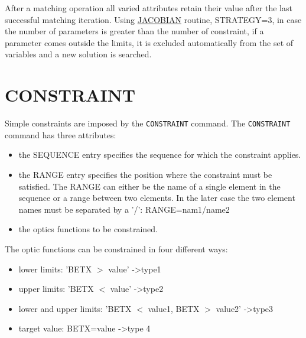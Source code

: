 After a matching operation all varied attributes retain their
value after the last successful matching iteration. Using
\href{match_xeq.html#jacobian}{JACOBIAN} routine, STRATEGY=3, in case
the number of parameters is greater than the number of constraint, if a
parameter comes outside the limits, it is excluded automatically from
the set of variables and a new solution is searched.  




%

\section{CONSTRAINT}
\label{sec:constraint}

Simple constraints are imposed by the {\tt CONSTRAINT} command. 
The {\tt CONSTRAINT} command has three attributes:   
\begin{itemize}
 \item  the SEQUENCE entry specifies the sequence for which the
   constraint applies.  
 \item  the RANGE entry specifies the position where the
   constraint must be satisfied. The RANGE can either be the name
   of a single element in the sequence or a range between two
   elements. In the later case the two element names must be
   separated by a '/': RANGE=nam1/name2  
 \item the optics functions to be constrained. 
\end{itemize} 

The optic functions can be constrained in four different ways: 
\begin{itemize}
 \item lower limits: 'BETX $>$ value' -\textgreater type1 
 \item upper limits: 'BETX $<$ value' -\textgreater type2 
 \item lower and upper limits: 'BETX $<$ value1, 
   BETX $>$ value2' -\textgreater type3  
 \item target value: BETX=value -\textgreater type 4 
\end{itemize} 

